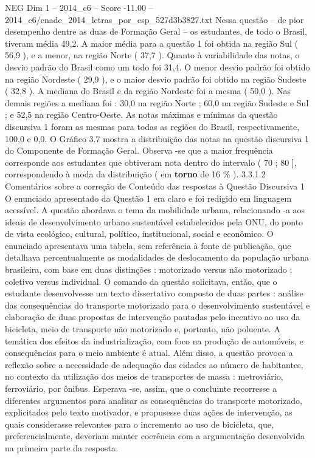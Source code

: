 \begin{textsample}{NEG Dim 1 – 2014\_c6 – Score -11.00 – 2014\_c6/enade\_2014\_letras\_por\_esp\_527d3b3827.txt}
Nessa questão – de pior desempenho dentre as duas de Formação Geral – os estudantes, de todo o Brasil, tiveram média 49,2.
A maior média para a questão 1 foi obtida na região Sul ( 56,9 ), e a menor, na região Norte ( 37,7 ).
Quanto à variabilidade das notas, o desvio padrão do Brasil como um todo foi 31,4.
O menor desvio padrão foi obtido na região Nordeste ( 29,9 ), e o maior desvio padrão foi obtido na região Sudeste ( 32,8 ).
A mediana do Brasil e da região Nordeste foi a mesma ( 50,0 ).
Nas demais regiões a mediana foi : 30,0 na região Norte ; 60,0 na região Sudeste e Sul ; e 52,5 na região Centro-Oeste.
As notas máximas e mínimas da questão discursiva 1 foram as mesmas para todas as regiões do Brasil, respectivamente, 100,0 e 0,0.
O Gráfico 3.7 mostra a distribuição das notas na questão discursiva 1 do Componente de Formação Geral.
Observa -se que a maior frequência corresponde aos estudantes que obtiveram nota dentro do intervalo ( 70 ; 80 ], correspondendo à moda da distribuição ( em \textbf{torno} de 16 \% ). 3.3.1.2 Comentários sobre a correção de Conteúdo das respostas à Questão Discursiva 1 O enunciado apresentado da Questão 1 era claro e foi redigido em linguagem acessível.
A questão abordava o tema da mobilidade urbana, relacionando -a aos ideais de desenvolvimento urbano sustentável estabelecidos pela ONU, do ponto de vista ecológico, cultural, político, institucional, social e econômico.
O enunciado apresentava uma tabela, sem referência à fonte de publicação, que detalhava percentualmente as modalidades de deslocamento da população urbana brasileira, com base em duas distinções : motorizado versus não motorizado ; coletivo versus individual.
O comando da questão solicitava, então, que o estudante desenvolvesse um texto dissertativo composto de duas partes : análise das consequências do transporte motorizado para o desenvolvimento sustentável e elaboração de duas propostas de intervenção pautadas pelo incentivo ao uso da bicicleta, meio de transporte não motorizado e, portanto, não poluente.
A temática dos efeitos da industrialização, com foco na produção de automóveis, e consequências para o meio ambiente é atual.
Além disso, a questão provoca a reflexão sobre a necessidade de adequação das cidades ao número de habitantes, no contexto da utilização dos meios de transportes de massa : metroviário, ferroviário, por ônibus.
Esperava -se, assim, que o concluinte recorresse a diferentes argumentos para analisar as consequências do transporte motorizado, explicitados pelo texto motivador, e propusesse duas ações de intervenção, as quais considerasse relevantes para o incremento ao uso de bicicleta, que, preferencialmente, deveriam manter coerência com a argumentação desenvolvida na primeira parte da resposta.

\end{textsample}
